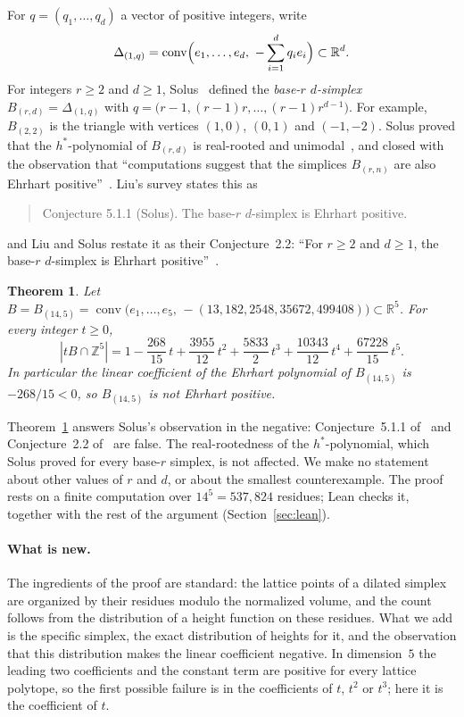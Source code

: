 \documentclass[11pt]{article}
\newtheorem{theorem}{Theorem}
\theoremstyle{remark}
\newcommand{\ZZ}{\mathbb{Z}}
\newcommand{\RR}{\mathbb{R}}
\newcommand{\conv}{\operatorname{conv}}
\begin{document}
For $q=(q_1,\dots,q_d)$ a vector of positive integers, write
\[
\Delta_{(1,q)}=\conv\Bigl(e_1,\dots,e_d,\ -\sum_{i=1}^d q_ie_i\Bigr)\subset\RR^d .
\]
For integers $r\ge2$ and $d\ge1$, Solus~\cite[Section~4]{Solus} defined the \emph{base-$r$ $d$-simplex} $B_{(r,d)}=\Delta_{(1,q)}$ with $q=\bigl(r-1,(r-1)r,\dots,(r-1)r^{d-1}\bigr)$. For example, $B_{(2,2)}$ is the triangle with vertices $(1,0)$, $(0,1)$ and $(-1,-2)$. Solus proved that the $h^*$-polynomial of $B_{(r,d)}$ is real-rooted and unimodal~\cite[Section~4.2]{Solus}, and closed with the observation that ``computations suggest that the simplices $B_{(r,n)}$ are also Ehrhart positive''~\cite[Section~5]{Solus}. Liu's survey states this as
\begin{quote}
Conjecture 5.1.1 (Solus). The base-$r$ $d$-simplex is Ehrhart positive.~\cite[Section~5.1.1]{Liu}
\end{quote}
and Liu and Solus restate it as their Conjecture~2.2: ``For $r\ge2$ and $d\ge1$, the base-$r$ $d$-simplex is Ehrhart positive''~\cite[Section~2.3]{LiuSolus}.

\begin{theorem}\label{main}
Let $B=B_{(14,5)}=\conv\bigl(e_1,\dots,e_5,\,-(13,182,2548,35672,499408)\bigr)\subset\RR^5$. For every integer $t\ge0$,
\[
|tB\cap\ZZ^5| = 1-\frac{268}{15}\,t+\frac{3955}{12}\,t^2+\frac{5833}{2}\,t^3+\frac{10343}{12}\,t^4+\frac{67228}{15}\,t^5 .
\]
In particular the linear coefficient of the Ehrhart polynomial of $B_{(14,5)}$ is $-268/15<0$, so $B_{(14,5)}$ is not Ehrhart positive.
\end{theorem}

Theorem~\ref{main} answers Solus's observation in the negative: Conjecture~5.1.1 of~\cite{Liu} and Conjecture~2.2 of~\cite{LiuSolus} are false. The real-rootedness of the $h^*$-polynomial, which Solus proved for every base-$r$ simplex, is not affected. We make no statement about other values of $r$ and $d$, or about the smallest counterexample. The proof rests on a finite computation over $14^5=537{,}824$ residues; Lean checks it, together with the rest of the argument (Section~\ref{sec:lean}).

\paragraph{What is new.} The ingredients of the proof are standard: the lattice points of a dilated simplex are organized by their residues modulo the normalized volume, and the count follows from the distribution of a height function on these residues. What we add is the specific simplex, the exact distribution of heights for it, and the observation that this distribution makes the linear coefficient negative. In dimension~$5$ the leading two coefficients and the constant term are positive for every lattice polytope, so the first possible failure is in the coefficients of $t$, $t^2$ or $t^3$; here it is the coefficient of $t$.
\end{document}
